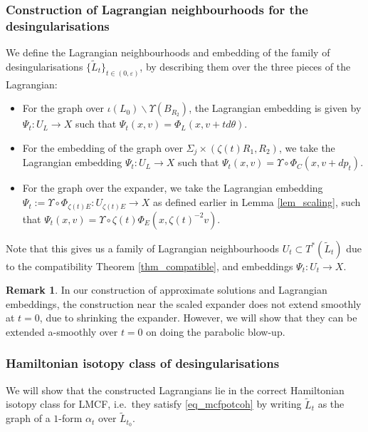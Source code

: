 \documentclass[10pt, a4paper]{article}
\theoremstyle{plain}%
\theoremstyle{definition}
\newtheorem{rem}[theorem]{Remark}
\numberwithin{figure}{section}
\numberwithin{equation}{section}
\newcommand{\ep}{\varepsilon}
\newcommand{\tL}{\widetilde{L}}
\begin{document}
 \subsubsection{Construction of Lagrangian neighbourhoods for the desingularisations}
 
 We define the Lagrangian neighbourhoods and embedding of the family of desingularisations $\{\tilde{L}_t\}_{t\in(0,\ep)}$, by describing them over the three pieces of the Lagrangian:
 \begin{itemize}
 	\item For the graph over $\iota(L_0)\backslash \Upsilon(B_{R_2})$, the Lagrangian embedding is given by $\Psi_t : U_L \rightarrow X$ such that $\Psi_t (x,v) = \Phi_L(x,v+td\theta)$.
 	\item For the embedding of the graph over $\Sigma_j\times (\zeta(t)R_1,R_2)$, we take the Lagrangian embedding $\Psi_t: U_L \rightarrow X$ such that $\Psi_t(x,v) = \Upsilon\circ\Phi_C(x,v + dp_t)$. 
 	
 	\item For the graph over the expander, we take the Lagrangian embedding $\Psi_t := \Upsilon\circ\Phi_{\zeta(t)E}: U_{\zeta(t)E}\rightarrow X$ as defined earlier in Lemma \ref{lem_scaling}, such that $\Psi_t(x,v) = \Upsilon \circ \zeta(t)\Phi_{E}(x, \zeta(t)^{-2} v).$
 \end{itemize}
 
 Note that this gives us a family of Lagrangian neighbourhoods $U_t \subset T^*(\tilde{L}_t)$ due to the compatibility Theorem \ref{thm_compatible}, and embeddings $\Psi_t : U_t \rightarrow X$. 
 
 \begin{rem} In our construction of approximate solutions and Lagrangian embeddings, the construction near the scaled expander does not extend smoothly at $t=0$, due to shrinking the expander. However, we will show that they can be extended a-smoothly over $t=0$ on doing the parabolic blow-up.
 \end{rem}
 
 \subsubsection{Hamiltonian isotopy class of desingularisations}
We will show that the constructed Lagrangians lie in the correct Hamiltonian isotopy class for LMCF, i.e.\ they satisfy \eqref{eq_mcfpotcoh} by writing $\tL_{t}$ as the graph of a $1$-form $\alpha_t$ over $\tL_{t_0}$. 
\end{document}
